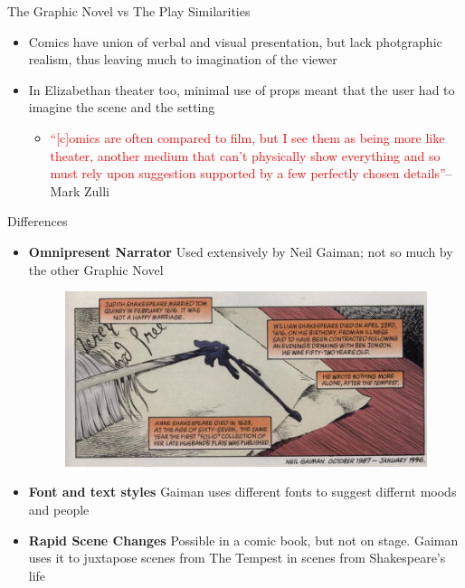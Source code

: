 \documentclass{beamer}
\begin{document}
  \begin{frame}[allowframebreaks]{The Graphic Novel vs The Play}
    Similarities
    \begin{itemize}
    \item Comics have union of verbal and visual presentation, but lack photgraphic realism, thus leaving much to imagination of the viewer
    \item In Elizabethan theater too, minimal use of props meant that the user had to imagine the scene and the setting

      \begin{itemize}
        \item \textcolor{red}{``[c]omics are often compared to film, but I see them as being more like theater, another medium that can't physically show everything and so must rely upon suggestion supported by a few perfectly chosen details''}--Mark Zulli ~\cite{sixcharacters}
      \end{itemize}
    \end{itemize}
    Differences
    \begin{itemize}
    \item \textbf{Omnipresent Narrator} Used extensively by Neil Gaiman; not so much by the other Graphic Novel
      \begin{figure}[htp]
        \begin{center}
          \centering
          \includegraphics[scale=0.35]{../Presentation/omnipresent.jpg}
        \end{center}
      \end{figure}
    \item \textbf{Font and text styles} Gaiman uses different fonts to suggest differnt moods and people
    \item \textbf{Rapid Scene Changes} Possible in a comic book, but not on stage. Gaiman uses it to juxtapose scenes from The Tempest in scenes from Shakespeare's life
    \end{itemize}
  \end{frame}
  
\end{document}
